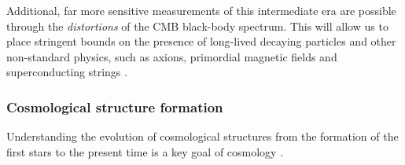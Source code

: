 Additional, far more sensitive measurements of this intermediate era are possible through the {\it distortions} of the 
CMB black-body spectrum. This will allow us to place stringent bounds on the presence of long-lived decaying 
particles \citep{Hu1993b, Chluba2013fore, Chluba2013PCA, Dimastrogiovanni2015} and other non-standard 
physics, such as axions, primordial magnetic fields and superconducting 
strings \citep[e.g.,][]{Jedamzik2000, Tashiro2012, Dolgov2013, Tashiro2013, Caldwell2013}.

\vspace{-0.15in}

\subsubsection{Cosmological structure formation}

\vspace{-0.05in}

Understanding the evolution of cosmological structures from the formation of the
first stars to the present time is a key goal of cosmology \citep{dunlop2011}.


